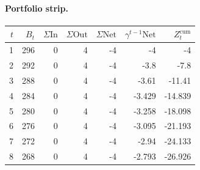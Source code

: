 \documentclass[12pt, a4paper]{article}
\begin{document}
\paragraph{Portfolio strip.}
\begin{center}
\begin{tabular}{rrrrrrr}
\toprule
$t$ & $B_t$ & $\Sigma\mathrm{In}$ & $\Sigma\mathrm{Out}$ & $\Sigma\mathrm{Net}$ & $\gamma^{t-1}\mathrm{Net}$ & $Z_t^{\mathrm{cum}}$\\
\midrule
1 & 296 & 0 & 4 & -4 & -4 & -4 \\
2 & 292 & 0 & 4 & -4 & -3.8 & -7.8 \\
3 & 288 & 0 & 4 & -4 & -3.61 & -11.41 \\
4 & 284 & 0 & 4 & -4 & -3.429 & -14.839 \\
5 & 280 & 0 & 4 & -4 & -3.258 & -18.098 \\
6 & 276 & 0 & 4 & -4 & -3.095 & -21.193 \\
7 & 272 & 0 & 4 & -4 & -2.94 & -24.133 \\
8 & 268 & 0 & 4 & -4 & -2.793 & -26.926 \\
\bottomrule
\end{tabular}
\end{center}
\end{document}
